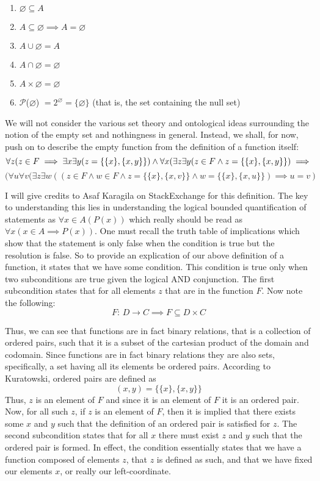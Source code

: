 \documentclass{article}
\begin{document}
\begin{enumerate}
\item $\varnothing \subseteq A$
\item $A \subseteq \varnothing \implies A=\varnothing$
\item $A \cup \varnothing = A$
\item $A \cap \varnothing = \varnothing$
\item $A \times \varnothing = \varnothing$
\item $\mathcal{P}$($\varnothing$) $= 2^\varnothing = \{\varnothing\}$ (that is, the set containing the null set)
\end{enumerate}
\par We will not consider the various set theory and ontological ideas surrounding the notion of the empty set and nothingness in general. Instead, we shall, for now, push on to describe the empty function from the definition of a function itself:
\[
\forall z (z\in F\implies\exists x\exists y(z=\{\{x\},\{x,y\}\})\land\\  \forall x(\exists z\exists y(z\in F\land z=\{\{x\},\{x,y\}\})\implies \\ 
\]
\[
(\forall u\forall v(\exists z\exists w((z\in F\land w\in F\land z= \{\{x\},\{x,v\}\}\land w=\{\{x\},\{x,u\}\})\implies u=v)
\]
\par I will give credits to Asaf Karagila on StackExchange for this definition. The key to understanding this lies in understanding the logical bounded quantification of statements as $\forall x\in A(P(x))$ which really should be read as $\forall x(x\in A\implies P(x))$. One must recall the truth table of implications which show that the statement is only false when the condition is true but the resolution is false. So to provide an explication of our above definition of a function, it states that we have some condition. This condition is true only when two subconditions are true given the logical AND conjunction. The first subcondition states that for all elements $z$ that are in the function $F$. Now note the following: 
\[
{F\text{: } D \to C} \implies F \subseteq D \times C
\]
\par Thus, we can see that functions are in fact binary relations, that is a collection of ordered pairs, such that it is a subset of the cartesian product of the domain and codomain. Since functions are in fact binary relations they are also sets, specifically, a set having all its elements be ordered pairs. According to Kuratowski, ordered pairs are defined as
\[
(x,y) = \{\{x\}, \{x,y\}\}
\]
Thus, $z$ is an element of $F$ and since it is an element of $F$ it is an ordered pair. Now, for all such $z$, if $z$ is an element of $F$, then it is implied that there exists some $x$ and $y$ such that the definition of an ordered pair is satisfied for $z$. The second subcondition states that for all $x$ there must exist $z$ and $y$ such that the ordered pair is formed. In effect, the condition essentially states that we have a function composed of elements $z$, that $z$ is defined as such, and that we have fixed our elements $x$, or really our left-coordinate.
\end{document}
